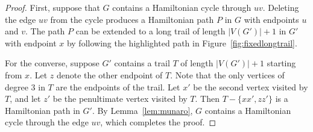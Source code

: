 \documentclass{article}
\theoremstyle{plain}
\newtheorem{theorem}{Theorem}
\newtheorem{lemma}[theorem]{Lemma}
\theoremstyle{definition}
\newcommand{\stephen}[1]{{\color{red!80!black}\textsc{Stephen:} #1}}
\begin{document}
\begin{proof}
    First, suppose that $G$ contains a Hamiltonian cycle through $uv$.
    Deleting the edge $uv$ from the cycle produces a Hamiltonian path $P$ in $G$ with endpoints $u$ and $v$.
    The path $P$ can be extended to a long trail of length $|V(G')|+1$ in $G'$ with endpoint $x$ by following the highlighted path in Figure~\ref{fig:fixedlongtrail}.

    For the converse, suppose $G'$ contains a trail $T$ of length $|V(G')|+1$ starting from $x$.
    Let $z$ denote the other endpoint of $T$.
    Note that the only vertices of degree $3$ in $T$ are the endpoints of the trail.
    Let $x'$ be the second vertex visited by $T$, and let $z'$ be the penultimate vertex visited by $T$.
    Then $T - \{xx', zz'\}$ is a Hamiltonian path in $G'$.
    By Lemma~\ref{lem:munaro}, 
    $G$ contains a Hamiltonian cycle through the edge $uv$, which completes the proof.
\end{proof}








    
\end{document}
